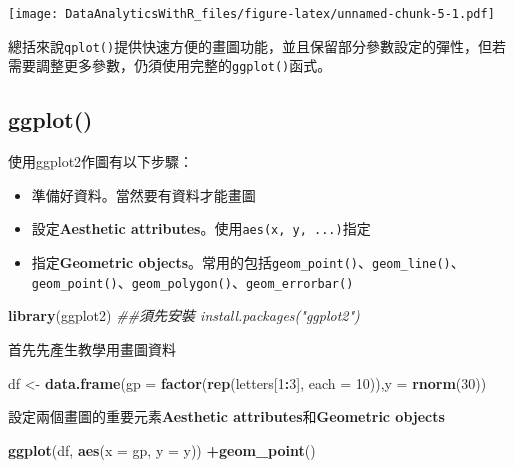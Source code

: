 \documentclass[
]{book}
\newenvironment{Shaded}{\begin{snugshade}}{\end{snugshade}}
\newcommand{\CommentTok}[1]{\textcolor[rgb]{0.56,0.35,0.01}{\textit{#1}}}
\newcommand{\DataTypeTok}[1]{\textcolor[rgb]{0.13,0.29,0.53}{#1}}
\newcommand{\DecValTok}[1]{\textcolor[rgb]{0.00,0.00,0.81}{#1}}
\newcommand{\KeywordTok}[1]{\textcolor[rgb]{0.13,0.29,0.53}{\textbf{#1}}}
\newcommand{\NormalTok}[1]{#1}
\newcommand{\OperatorTok}[1]{\textcolor[rgb]{0.81,0.36,0.00}{\textbf{#1}}}
\newcommand{\StringTok}[1]{\textcolor[rgb]{0.31,0.60,0.02}{#1}}
\providecommand{\tightlist}{%
  \setlength{\itemsep}{0pt}\setlength{\parskip}{0pt}}
\begin{document}
\texttt{[image: DataAnalyticsWithR\_files/figure-latex/unnamed-chunk-5-1.pdf]}

總括來說\texttt{qplot()}提供快速方便的畫圖功能，並且保留部分參數設定的彈性，但若需要調整更多參數，仍須使用完整的\texttt{ggplot()}函式。

\hypertarget{ggplot}{%
\subsection{ggplot()}\label{ggplot}}

使用ggplot2作圖有以下步驟：

\begin{itemize}
\tightlist
\item
  準備好資料。當然要有資料才能畫圖
\item
  設定\textbf{Aesthetic attributes}。使用\texttt{aes(x,\ y,\ ...)}指定
\item
  指定\textbf{Geometric objects}。常用的包括\texttt{geom\_point()}、\texttt{geom\_line()}、\texttt{geom\_point()}、\texttt{geom\_polygon()}、\texttt{geom\_errorbar()}
\end{itemize}

\begin{Shaded}
\begin{Highlighting}[]
\KeywordTok{library}\NormalTok{(ggplot2) }\CommentTok{##須先安裝 install.packages("ggplot2")}
\end{Highlighting}
\end{Shaded}

首先先產生教學用畫圖資料

\begin{Shaded}
\begin{Highlighting}[]
\NormalTok{df <-}\StringTok{ }\KeywordTok{data.frame}\NormalTok{(}\DataTypeTok{gp =} \KeywordTok{factor}\NormalTok{(}\KeywordTok{rep}\NormalTok{(letters[}\DecValTok{1}\OperatorTok{:}\DecValTok{3}\NormalTok{], }\DataTypeTok{each =} \DecValTok{10}\NormalTok{)),}\DataTypeTok{y =} \KeywordTok{rnorm}\NormalTok{(}\DecValTok{30}\NormalTok{))}
\end{Highlighting}
\end{Shaded}

設定兩個畫圖的重要元素\textbf{Aesthetic attributes}和\textbf{Geometric objects}

\begin{Shaded}
\begin{Highlighting}[]
\KeywordTok{ggplot}\NormalTok{(df, }\KeywordTok{aes}\NormalTok{(}\DataTypeTok{x =}\NormalTok{ gp, }\DataTypeTok{y =}\NormalTok{ y)) }\OperatorTok{+}\KeywordTok{geom_point}\NormalTok{()}
\end{Highlighting}
\end{Shaded}
\end{document}
